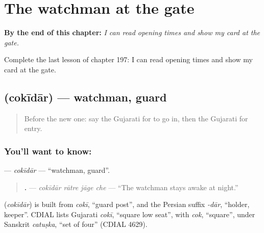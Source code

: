 
\chapter{The watchman at the gate}
\label{ch:gu-the-watchman-at-the-gate}

\begin{chapteropening}
\textbf{By the end of this chapter:} \emph{I can read opening times and show my card at the gate.}

Complete the last lesson of chapter 197: I can read opening times and show my card at the gate.
\end{chapteropening}

\section[\texorpdfstring{\gu{ચોકીદાર} (cokīdār)}{ચોકીદાર (cokīdār)}]{ (cokīdār) — watchman, guard}

\label{lesson:GU-C197-cokidar}



\begin{quote}
Before the new one: say the Gujarati for to go in, then the Gujarati for entry.
\end{quote}

\subsection*{You'll want to know: }
\textbf{} — \emph{cokīdār} — \textquotedblleft{}watchman, guard\textquotedblright{}.

\begin{quote}
\textbf{   .} — \emph{cokīdār rātre jāge che} — \textquotedblleft{}The watchman stays awake at night.\textquotedblright{}
\end{quote}

\begin{cousinweb}
\textbf{} (\emph{cokīdār}) is built from \emph{cokī}, \textquotedblleft{}guard post\textquotedblright{}, and the Persian suffix \emph{-dār}, \textquotedblleft{}holder, keeper\textquotedblright{}. CDIAL lists Gujarati \emph{cokī}, \textquotedblleft{}square low seat\textquotedblright{}, with \emph{cok}, \textquotedblleft{}square\textquotedblright{}, under Sanskrit \emph{catuṣka}, \textquotedblleft{}set of four\textquotedblright{} (CDIAL 4629).
\end{cousinweb}

